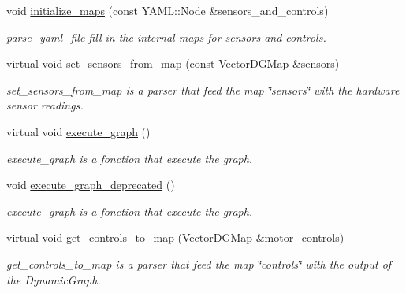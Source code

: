 \begin{DoxyCompactItemize}
\mbox{\label{classdynamic__graph_1_1Device_ac4203f6753b2d534c0ade84fb52ac47e}} 
void \hyperlink{classdynamic__graph_1_1Device_ac4203f6753b2d534c0ade84fb52ac47e}{initialize\+\_\+maps} (const Y\+A\+M\+L\+::\+Node \&sensors\+\_\+and\+\_\+controls)
\begin{DoxyCompactList}\small\item\em parse\+\_\+yaml\+\_\+file fill in the internal maps for sensors and controls. \end{DoxyCompactList}\item 
virtual void \hyperlink{classdynamic__graph_1_1Device_ab8dc9a016ebbc34521812a27b5aa6efa}{set\+\_\+sensors\+\_\+from\+\_\+map} (const \hyperlink{namespacedynamic__graph_abd184187f3bc15df5e227d866529e4a7}{Vector\+D\+G\+Map} \&sensors)
\begin{DoxyCompactList}\small\item\em set\+\_\+sensors\+\_\+from\+\_\+map is a parser that feed the map \char`\"{}sensors\char`\"{} with the hardware sensor readings. \end{DoxyCompactList}\item 
virtual void \hyperlink{classdynamic__graph_1_1Device_adb596e7acd67089bb4929cf577b3c6ff}{execute\+\_\+graph} ()
\begin{DoxyCompactList}\small\item\em execute\+\_\+graph is a fonction that execute the graph. \end{DoxyCompactList}\item 
void \hyperlink{classdynamic__graph_1_1Device_a126268314fea8fff802fc957cbf3e0d7}{execute\+\_\+graph\+\_\+deprecated} ()
\begin{DoxyCompactList}\small\item\em execute\+\_\+graph is a fonction that execute the graph. \end{DoxyCompactList}\item 
virtual void \hyperlink{classdynamic__graph_1_1Device_a3291a91974c35f03719220e237512aa8}{get\+\_\+controls\+\_\+to\+\_\+map} (\hyperlink{namespacedynamic__graph_abd184187f3bc15df5e227d866529e4a7}{Vector\+D\+G\+Map} \&motor\+\_\+controls)
\begin{DoxyCompactList}\small\item\em get\+\_\+controls\+\_\+to\+\_\+map is a parser that feed the map \char`\"{}controls\char`\"{} with the output of the Dynamic\+Graph. \end{DoxyCompactList}\end{DoxyCompactItemize}
